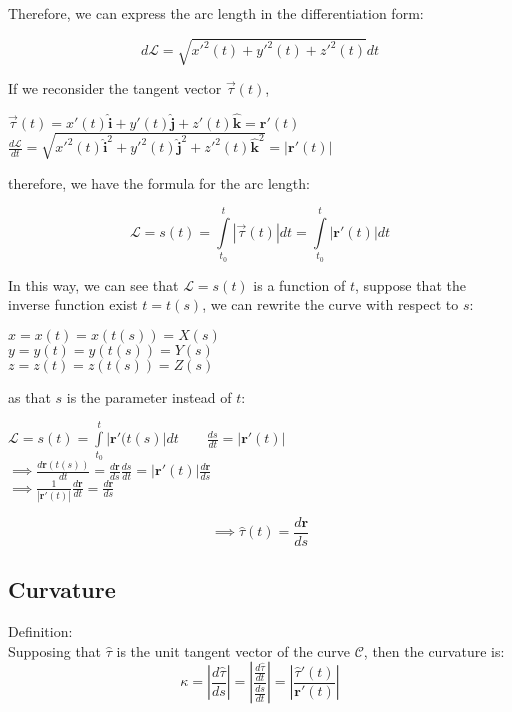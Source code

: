 \documentclass[UTF8,a4paper, 10pt, openany]{svmono}
\begin{document}
Therefore, we can express the arc length in the differentiation form:

\begin{equation}
\boxed{d\mathcal{L}=\sqrt{x'^2(t)+y'^2(t)+z'^2(t)}dt}
\end{equation}

If we reconsider the tangent vector $\overrightarrow{\tau }(t)$,

\begin{center}
$\overrightarrow{\tau }(t)=x'(t)\mathbf{\hat{i}}+y'(t)\mathbf{\hat{j}}+z'(t)\mathbf{\hat{k}}=\mathbf{r}'(t)$\\
$\frac{d\mathcal{L}}{dt}=\sqrt{x'^2(t)\mathbf{\hat{i}}^2+y'^2(t)\mathbf{\hat{j}}^2+z'^2(t)\mathbf{\hat{k}}^2}=|\mathbf{r}'(t)|$
\end{center}

therefore, we have the formula for the arc length:

\begin{equation}
\boxed{\mathcal{L}=s(t)=\displaystyle\int\limits_{t_0}^t|\overrightarrow{\tau }(t)|dt=\displaystyle\int\limits_{t_0}^t|\mathbf{r}'(t)|dt}
\end{equation}

In this way, we can see that $\mathcal{L}=s(t)$ is a function of $t$, suppose that the inverse function exist $t=t(s)$, we can rewrite the curve with respect to $s$:
\begin{center}
$x=x(t)=x(t(s))=X(s)$\\
$y=y(t)=y(t(s))=Y(s)$\\
$z=z(t)=z(t(s))=Z(s)$
\end{center}
as that $s$ is the parameter instead of $t$:
\begin{center}
$\mathcal{L}=s(t)=\displaystyle\int\limits_{t_0}^t|\mathbf{r}'(t(s)|dt \qquad \frac{ds}{dt}=|\mathbf{r}'(t)|$\\
$\implies \frac{d\mathbf{r}(t(s))}{dt}=\frac{d\mathbf{r}}{ds}\frac{ds}{dt}=|\mathbf{r}'(t)|\frac{d\mathbf{r}}{ds}$\\
$\implies \frac{1}{|\mathbf{r}'(t)|}\frac{d\mathbf{r}}{dt}=\frac{d\mathbf{r}}{ds}$\\
\end{center}
\begin{equation}
\boxed{\implies \hat{\tau}(t)=\frac{d\mathbf{r}}{ds}}
\end{equation}
\subsection{Curvature}
Definition:\\
Supposing that $\hat{\tau}$ is the unit tangent vector of the curve $\mathcal{C}$, then the curvature is:
\begin{equation}
\boxed{		\kappa=\left| \frac{d\hat{\tau}}{ds} \right|	=	\left|\frac{\frac{d\hat{\tau}}{dt}}{\frac{ds}{dt}}\right|	=	\left|\frac{\hat{\tau}'(t)}{\mathbf{r}'(t)}\right|	}
\end{equation}
\end{document}
